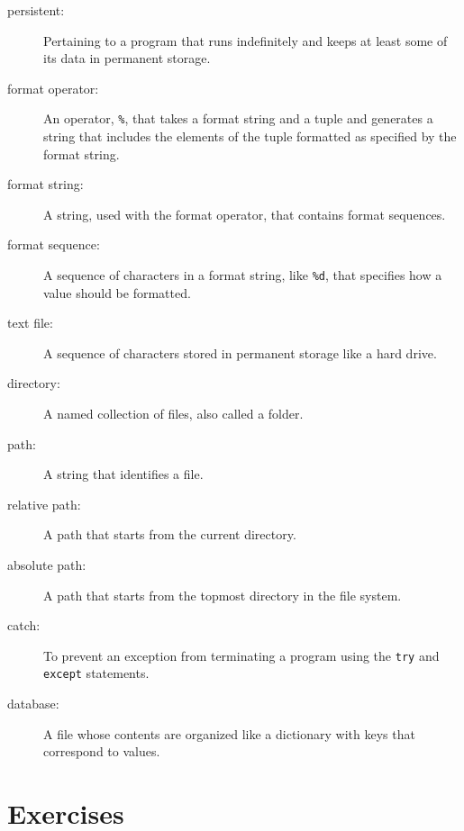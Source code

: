 \documentclass[10pt]{book}
\begin{document}
\begin{description}

\item[persistent:] Pertaining to a program that runs indefinitely
and keeps at least some of its data in permanent storage.

\item[format operator:] An operator, {\tt \%}, that takes a format
string and a tuple and generates a string that includes
the elements of the tuple formatted as specified by the format string.

\item[format string:] A string, used with the format operator, that
contains format sequences.

\item[format sequence:] A sequence of characters in a format string,
like {\tt \%d}, that specifies how a value should be formatted.

\item[text file:] A sequence of characters stored in permanent
storage like a hard drive.

\item[directory:] A named collection of files, also called a folder.

\item[path:] A string that identifies a file.

\item[relative path:] A path that starts from the current directory.

\item[absolute path:] A path that starts from the topmost directory
in the file system.

\item[catch:] To prevent an exception from terminating
a program using the {\tt try}
and {\tt except} statements.

\item[database:] A file whose contents are organized like a dictionary
with keys that correspond to values.

\end{description}


\section{Exercises}
\end{document}
